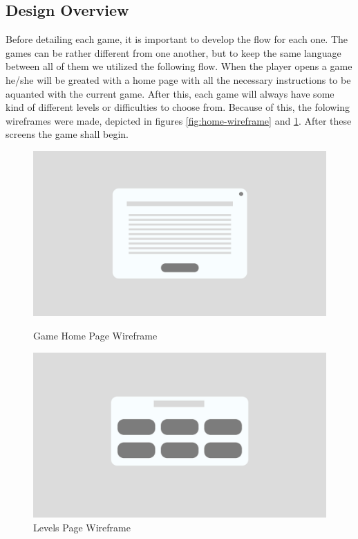 \subsection*{Design Overview}

Before detailing each game, it is important to develop the flow for each one. The games can be rather different from one another, but to keep the same language between all of them we utilized the following flow. When the player opens a game he/she will be greated with a home page with all the necessary instructions to be aquanted with the current game. After this, each game will always have some kind of different levels or difficulties to choose from.
Because of this, the folowing wireframes were made, depicted in figures \ref{fig:home-wireframe} and \ref{fig:levels-wireframe}. After these screens the game shall begin.

\begin{figure}[H]
    \centering
    \begin{minipage}{0.45\textwidth}
      \centering
      \includegraphics[width=\linewidth]{Chapters/figma/home-wireframe.png}
      \caption{Game Home Page Wireframe}
      \label{fig:home-wireframe}
    \end{minipage}
    \hfill
    \begin{minipage}{0.45\textwidth}
      \centering
      \includegraphics[width=\linewidth]{Chapters/figma/levels-wireframe.png}
      \caption{Levels Page Wireframe}
      \label{fig:levels-wireframe}
    \end{minipage}
\end{figure}

